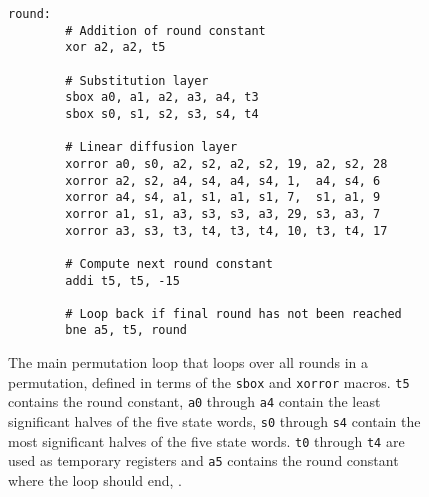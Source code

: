 \begin{figure}[p]
\begin{verbatim}
round:
        # Addition of round constant
        xor a2, a2, t5

        # Substitution layer
        sbox a0, a1, a2, a3, a4, t3
        sbox s0, s1, s2, s3, s4, t4

        # Linear diffusion layer
        xorror a0, s0, a2, s2, a2, s2, 19, a2, s2, 28
        xorror a2, s2, a4, s4, a4, s4, 1,  a4, s4, 6
        xorror a4, s4, a1, s1, a1, s1, 7,  s1, a1, 9
        xorror a1, s1, a3, s3, s3, a3, 29, s3, a3, 7
        xorror a3, s3, t3, t4, t3, t4, 10, t3, t4, 17

        # Compute next round constant
        addi t5, t5, -15

        # Loop back if final round has not been reached
        bne a5, t5, round
\end{verbatim}

\caption{The main permutation loop that loops over all rounds in a permutation,
defined in terms of the \texttt{sbox} and \texttt{xorror} macros.
\texttt{t5} contains the round constant, \texttt{a0} through \texttt{a4}
contain the least significant halves of the five state words, \texttt{s0}
through \texttt{s4} contain the most significant halves of the five state words.
\texttt{t0} through \texttt{t4} are used as temporary registers and \texttt{a5}
contains the round constant where the loop should end, .}

\label{round}
\end{figure}
